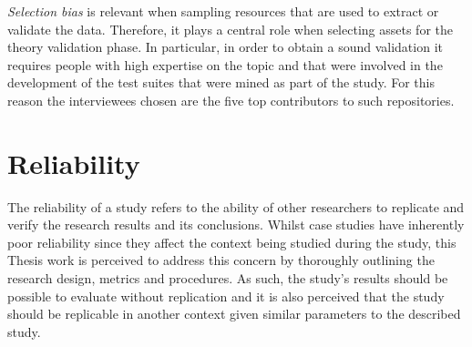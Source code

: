 \textit{Selection bias} is relevant when sampling resources that are used to extract or validate the data. Therefore, it plays a central role when selecting assets for the theory validation phase. In particular, in order to obtain a sound validation it requires people with high expertise on the topic and that were involved in the development of the test suites that were mined as part of the study. For this reason the interviewees chosen are the five top contributors to such repositories.


\section{Reliability}
The reliability of a study refers to the ability of other researchers to replicate and verify the research results and its conclusions.
Whilst case studies have inherently poor reliability since they affect the context being studied during the study, this Thesis work is perceived to address this concern by thoroughly outlining the research design, metrics and procedures.
As such, the study's results should be possible to evaluate without replication and it is also perceived that the study should be replicable in another context given similar parameters to the described study.

